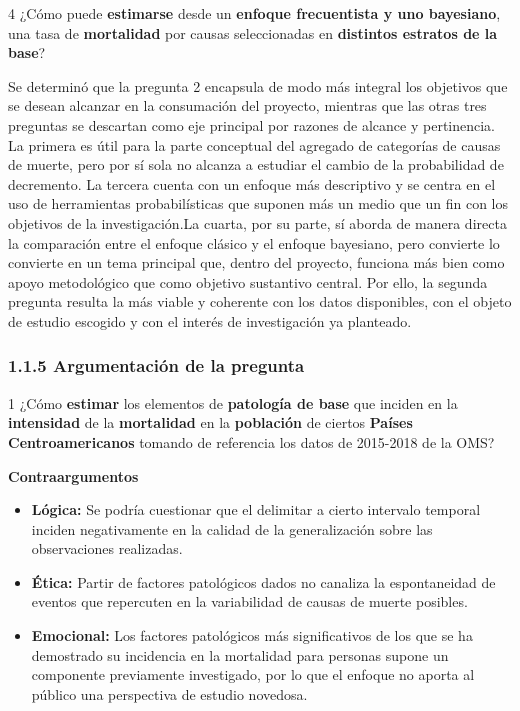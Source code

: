 \documentclass[
  letterpaper,
  DIV=11,
  numbers=noendperiod]{scrartcl}
\begin{document}
4 ¿Cómo puede \textbf{estimarse} desde un \textbf{enfoque frecuentista y
uno bayesiano}, una tasa de \textbf{mortalidad} por causas seleccionadas
en \textbf{distintos estratos de la base}?

Se determinó que la pregunta 2 encapsula de modo más integral los
objetivos que se desean alcanzar en la consumación del proyecto,
mientras que las otras tres preguntas se descartan como eje principal
por razones de alcance y pertinencia. La primera es útil para la parte
conceptual del agregado de categorías de causas de muerte, pero por sí
sola no alcanza a estudiar el cambio de la probabilidad de decremento.
La tercera cuenta con un enfoque más descriptivo y se centra en el uso
de herramientas probabilísticas que suponen más un medio que un fin con
los objetivos de la investigación.La cuarta, por su parte, sí aborda de
manera directa la comparación entre el enfoque clásico y el enfoque
bayesiano, pero convierte lo convierte en un tema principal que, dentro
del proyecto, funciona más bien como apoyo metodológico que como
objetivo sustantivo central. Por ello, la segunda pregunta resulta la
más viable y coherente con los datos disponibles, con el objeto de
estudio escogido y con el interés de investigación ya planteado.

\subsubsection{1.1.5 Argumentación de la
pregunta}\label{argumentaciuxf3n-de-la-pregunta}

1 ¿Cómo \textbf{estimar} los elementos de \textbf{patología de base} que
inciden en la \textbf{intensidad} de la \textbf{mortalidad} en la
\textbf{población} de ciertos \textbf{Países Centroamericanos} tomando
de referencia los datos de 2015-2018 de la OMS?~

\textbf{Contraargumentos}

\begin{itemize}
\item
  \textbf{Lógica:} Se podría cuestionar que el delimitar a cierto
  intervalo temporal inciden negativamente en la calidad de la
  generalización sobre las observaciones realizadas.
\item
  \textbf{Ética:} Partir de factores patológicos dados no canaliza la
  espontaneidad de eventos que repercuten en la variabilidad de causas
  de muerte posibles.
\item
  \textbf{Emocional:} Los factores patológicos más significativos de los
  que se ha demostrado su incidencia en la mortalidad para personas
  supone un componente previamente investigado, por lo que el enfoque no
  aporta al público una perspectiva de estudio novedosa.
\end{itemize}
\end{document}
